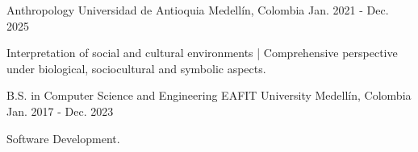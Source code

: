 

\begin{cventries}

  \cventry
    {Anthropology} %
    {Universidad de Antioquia} %
    {Medellín, Colombia} %
    {Jan. 2021 - Dec. 2025} %
    {
      \begin{cvitems} %
        \item {Interpretation of social and cultural environments | Comprehensive perspective under biological, sociocultural and symbolic aspects.}
      \end{cvitems}
    }
  \cventry
    {B.S. in Computer Science and Engineering} %
    {EAFIT University} %
    {Medellín, Colombia} %
    {Jan. 2017 - Dec. 2023} %
    {
      \begin{cvitems} %
        \item {Software Development.}
      \end{cvitems}
    }
\end{cventries}
